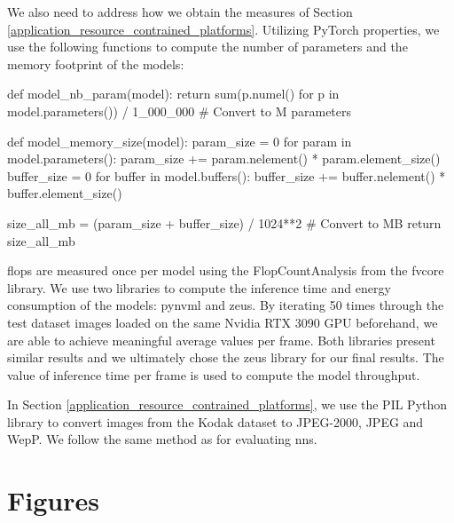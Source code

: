 \documentclass{article}
\begin{document}
We also need to address how we obtain the measures of Section \ref{application_resource_contrained_platforms}. Utilizing PyTorch properties, we use the following functions to compute the number of parameters and the memory footprint of the models:

\begin{pythonCode}
def model_nb_param(model):
    return sum(p.numel() for p in model.parameters()) / 1_000_000 # Convert to M parameters


def model_memory_size(model):
    param_size = 0
    for param in model.parameters():
        param_size += param.nelement() * param.element_size()
    buffer_size = 0
    for buffer in model.buffers():
        buffer_size += buffer.nelement() * buffer.element_size()

    size_all_mb = (param_size + buffer_size) / 1024**2 # Convert to MB
    return size_all_mb
\end{pythonCode}

\acrshort{flop}s are measured once per model using the \textsf{FlopCountAnalysis} from the fvcore library. We use two libraries to compute the inference time and energy consumption of the models: pynvml and zeus. By iterating 50 times through the test dataset images loaded on the same Nvidia RTX 3090 GPU beforehand, we are able to achieve meaningful average values per frame. Both libraries present similar results and we ultimately chose the zeus library for our final results. The value of inference time per frame is used to compute the model throughput.

In Section \ref{application_resource_contrained_platforms}, we use the PIL Python library to convert images from the Kodak dataset to JPEG-2000, JPEG and WepP. We follow the same method as for evaluating \acrshort{nn}s.

\section{Figures}
\end{document}
